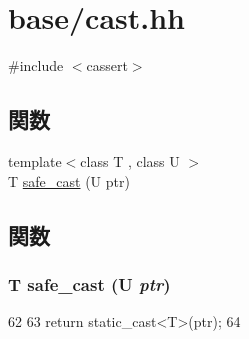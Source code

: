 \hypertarget{cast_8hh}{
\section{base/cast.hh}
\label{cast_8hh}
}
{\ttfamily \#include $<$cassert$>$}\par
\subsection*{関数}
\begin{DoxyCompactItemize}
\item 
{\footnotesize template$<$class T , class U $>$ }\\T \hyperlink{cast_8hh_a5f660f8e3c1002271ec98c59eeda331f}{safe\_\-cast} (U ptr)
\end{DoxyCompactItemize}


\subsection{関数}
\hypertarget{cast_8hh_a5f660f8e3c1002271ec98c59eeda331f}{
\subsubsection[{safe\_\-cast}]{\setlength{\rightskip}{0pt plus 5cm}T safe\_\-cast (U {\em ptr})}}
\label{cast_8hh_a5f660f8e3c1002271ec98c59eeda331f}



\begin{DoxyCode}
62 {
63     return static_cast<T>(ptr);
64 }
\end{DoxyCode}
